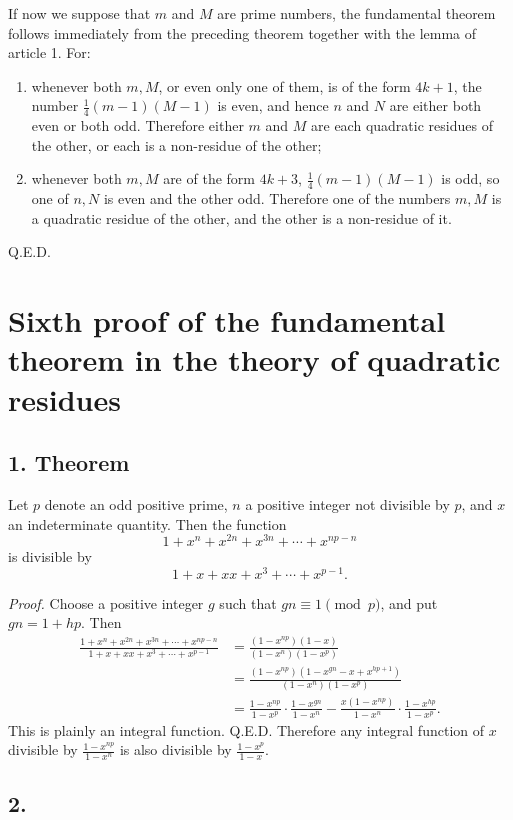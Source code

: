 \documentclass[12pt]{article}
\begin{document}
If now we suppose that $m$ and $M$ are prime numbers, the fundamental theorem follows immediately from the preceding theorem together with the lemma of article 1. For:
\begin{enumerate}[label=\Roman*.]
\item whenever both $m,M$, or even only one of them, is of the form $4k+1$, the number $\frac14(m-1)(M-1)$ is even, and hence $n$ and $N$ are either both even or both odd. Therefore either $m$ and $M$ are each quadratic residues of the other, or each is a non-residue of the other;
\item whenever both $m,M$ are of the form $4k+3$, $\frac14(m-1)(M-1)$ is odd, so one of $n,N$ is even and the other odd. Therefore one of the numbers $m,M$ is a quadratic residue of the other, and the other is a non-residue of it.
\end{enumerate}
Q.E.D.

\section*{Sixth proof of the fundamental theorem in the theory of quadratic residues}

\subsection*{1. Theorem}

Let $p$ denote an odd positive prime, $n$ a positive integer not divisible by $p$, and $x$ an indeterminate quantity. Then the function
\[
1+x^n+x^{2n}+x^{3n}+\cdots+x^{np-n}
\]
is divisible by
\[
1+x+xx+x^3+\cdots+x^{p-1}.
\]

\emph{Proof.} Choose a positive integer $g$ such that $gn\equiv1\pmod p$, and put $gn=1+hp$. Then
\[
\begin{aligned}
\frac{1+x^n+x^{2n}+x^{3n}+\cdots+x^{np-n}}{1+x+xx+x^3+\cdots+x^{p-1}}
&=\frac{(1-x^{np})(1-x)}{(1-x^n)(1-x^p)}\\
&=\frac{(1-x^{np})(1-x^{gn}-x+x^{hp+1})}{(1-x^n)(1-x^p)}\\
&=\frac{1-x^{np}}{1-x^p}\cdot\frac{1-x^{gn}}{1-x^n}
-\frac{x(1-x^{np})}{1-x^n}\cdot\frac{1-x^{hp}}{1-x^p}.
\end{aligned}
\]
This is plainly an integral function. Q.E.D. Therefore any integral function of $x$ divisible by $\frac{1-x^{np}}{1-x^n}$ is also divisible by $\frac{1-x^p}{1-x}$.

\subsection*{2.}
\end{document}
